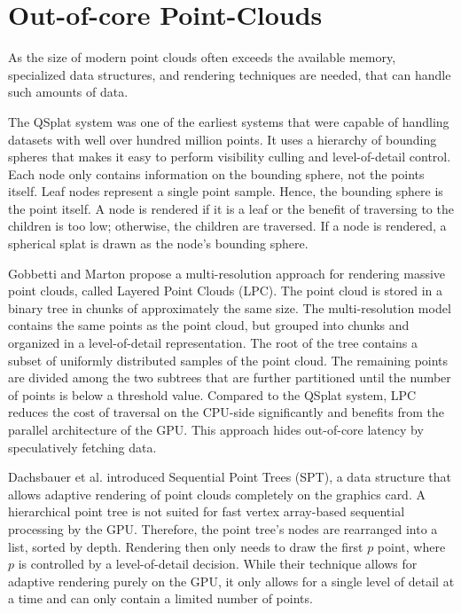 \section {Out-of-core Point-Clouds}
\label{sec:related_work_point_clouds}

As the size of modern point clouds often exceeds the available memory, specialized data structures, and rendering techniques are needed, that can handle such amounts of data. 

The QSplat system \cite{rusinkiewicz2000qsplat} was one of the earliest systems that were capable of handling datasets with well over hundred million points. It uses a hierarchy of bounding spheres that makes it easy to perform visibility culling and level-of-detail control. Each node only contains information on the bounding sphere, not the points itself. Leaf nodes represent a single point sample. Hence, the bounding sphere is the point itself. A node is rendered if it is a leaf or the benefit of traversing to the children is too low; otherwise, the children are traversed. If a node is rendered, a spherical splat is drawn as the node's bounding sphere. 

\par

Gobbetti and Marton \cite{gobbetti2004layered} propose a multi-resolution approach for rendering massive point clouds, called Layered Point Clouds (LPC). The point cloud is stored in a binary tree in chunks of approximately the same size. The multi-resolution model contains the same points as the point cloud, but grouped into chunks and organized in a level-of-detail representation. The root of the tree contains a subset of uniformly distributed samples of the point cloud. The remaining points are divided among the two subtrees that are further partitioned until the number of points is below a threshold value. Compared to the QSplat system, LPC reduces the cost of traversal on the CPU-side significantly and benefits from the parallel architecture of the GPU. This approach hides out-of-core latency by speculatively fetching data. 

\par

Dachsbauer et al. \cite{dachsbacher2003sequential} introduced Sequential Point Trees (SPT), a data structure that allows adaptive rendering of point clouds completely on the graphics card. A hierarchical point tree is not suited for fast vertex array-based sequential processing by the GPU. Therefore, the point tree's nodes are rearranged into a list, sorted by depth. Rendering then only needs to draw the first $p$ point, where $p$ is controlled by a level-of-detail decision. While their technique allows for adaptive rendering purely on the GPU, it only allows for a single level of detail at a time and can only contain a limited number of points. 

